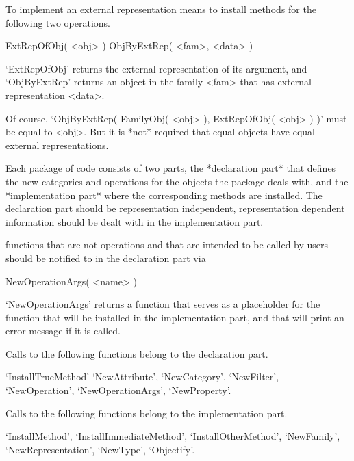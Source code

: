 To implement an external representation means to install methods for the
following two operations.

\>ExtRepOfObj( <obj> )
\>ObjByExtRep( <fam>, <data> )

`ExtRepOfObj' returns the external representation of its argument,
and `ObjByExtRep' returns an object in the family <fam> that has
external representation <data>.

Of course, `ObjByExtRep( FamilyObj( <obj> ), ExtRepOfObj( <obj> ) )'
must be equal to <obj>.
But it is *not* required that equal objects have equal external
representations.



Each package of {\GAP} code consists of two parts,
the *declaration part* that defines the new categories and operations for
the objects the package deals with,
and the *implementation part* where the corresponding methods are
installed.
The declaration part should be representation independent,
representation dependent information should be dealt with in the
implementation part.

{\GAP} functions that are not operations and that are intended to be
called by users should be notified to {\GAP} in the declaration part via

\>NewOperationArgs( <name> )

`NewOperationArgs' returns a function that serves as a placeholder
for the function that will be installed in the implementation part,
and that will print an error message if it is called.



Calls to the following functions belong to the declaration part.

`InstallTrueMethod'
`NewAttribute',
`NewCategory',
`NewFilter',
`NewOperation',
`NewOperationArgs',
`NewProperty'.

Calls to the following functions belong to the implementation part.

`InstallMethod',
`InstallImmediateMethod',
`InstallOtherMethod',
`NewFamily',
`NewRepresentation',
`NewType',
`Objectify'.


